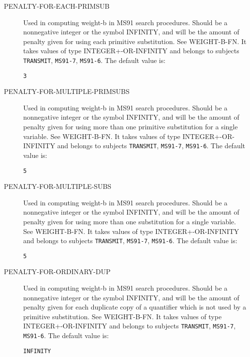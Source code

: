 \begin{description}
\item[PENALTY-FOR-EACH-PRIMSUB]  
Used in computing weight-b in MS91 search procedures.  Should be 
a nonnegative integer or the symbol INFINITY, and will be the amount 
of penalty given for using each primitive substitution. See WEIGHT-B-FN.
It takes values of type INTEGER+-OR-INFINITY and belongs to subjects \texttt{TRANSMIT}, \texttt{MS91-7}, \texttt{MS91-6}.  The default value is: \begin{lstlisting}
3
\end{lstlisting}

\item[PENALTY-FOR-MULTIPLE-PRIMSUBS]  
Used in computing weight-b in MS91 search procedures.  Should be 
a nonnegative integer or the symbol INFINITY, and will be the amount 
of penalty given for using more than one primitive substitution for a single
variable. See WEIGHT-B-FN.
It takes values of type INTEGER+-OR-INFINITY and belongs to subjects \texttt{TRANSMIT}, \texttt{MS91-7}, \texttt{MS91-6}.  The default value is: \begin{lstlisting}
5
\end{lstlisting}

\item[PENALTY-FOR-MULTIPLE-SUBS]  
Used in computing weight-b in MS91 search procedures.  Should be 
a nonnegative integer or the symbol INFINITY, and will be the amount 
of penalty given for using more than one substitution for a single
variable. See WEIGHT-B-FN.
It takes values of type INTEGER+-OR-INFINITY and belongs to subjects \texttt{TRANSMIT}, \texttt{MS91-7}, \texttt{MS91-6}.  The default value is: \begin{lstlisting}
5
\end{lstlisting}

\item[PENALTY-FOR-ORDINARY-DUP]  
Used in computing weight-b in MS91 search procedures.  Should be 
a nonnegative integer or the symbol INFINITY, and will be the amount 
of penalty given for each duplicate copy of a quantifier which is not 
used by a primitive substitution. See WEIGHT-B-FN.
It takes values of type INTEGER+-OR-INFINITY and belongs to subjects \texttt{TRANSMIT}, \texttt{MS91-7}, \texttt{MS91-6}.  The default value is: \begin{lstlisting}
INFINITY
\end{lstlisting}


\end{description}

